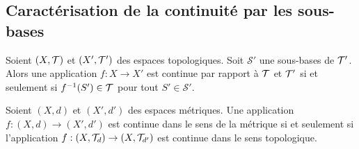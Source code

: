 \subsection{Caractérisation de la continuité par les sous-bases}
\begin{lemme} \label{lem: Caractérisation de la continuité par les sous-bases}
	Soient $(X, \mathcal T)$ et $(X', \mathcal T')$ des espaces topologiques. Soit $\mathcal S'$ une sous-bases de $\mathcal T'$. Alors une application $f : X \to X'$ est continue par rapport à $\mathcal T$ et $\mathcal T'$ si et seulement si $f^{-1}(S') \in \mathcal T$ pour tout $S' \in \mathcal S'$.
\end{lemme}


\begin{lemme}
	Soient $(X, d)$ et $(X', d')$ des espaces métriques. Une application $f : (X, d) \to (X', d')$ est continue dans le sens de la métrique si et seulement si l'application $f : (X, \mathcal T_d) \to (X, \mathcal T_{d'})$ est continue dans le sens topologique.
\end{lemme}

